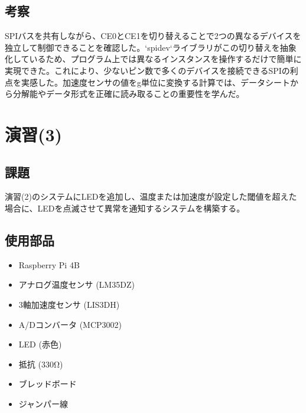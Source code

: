 \documentclass[a4paper,11pt,dvipdfmx]{jsarticle}
\begin{document}
\subsection{考察}
SPIバスを共有しながら、CE0とCE1を切り替えることで2つの異なるデバイスを独立して制御できることを確認した。`spidev`ライブラリがこの切り替えを抽象化しているため、プログラム上では異なるインスタンスを操作するだけで簡単に実現できた。これにより、少ないピン数で多くのデバイスを接続できるSPIの利点を実感した。加速度センサの値をg単位に変換する計算では、データシートから分解能やデータ形式を正確に読み取ることの重要性を学んだ。

\section{演習(3)}
\subsection{課題}
演習(2)のシステムにLEDを追加し、温度または加速度が設定した閾値を超えた場合に、LEDを点滅させて異常を通知するシステムを構築する。

\subsection{使用部品}
\begin{itemize}
    \item Raspberry Pi 4B
    \item アナログ温度センサ (LM35DZ)
    \item 3軸加速度センサ (LIS3DH)
    \item A/Dコンバータ (MCP3002)
    \item LED (赤色)
    \item 抵抗 (330Ω)
    \item ブレッドボード
    \item ジャンパー線
\end{itemize}
\end{document}
